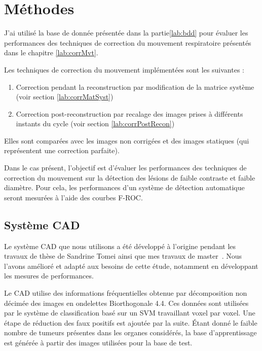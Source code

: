\chapter{Méthodes}

J'ai utilisé la base de donnée présentée dans la partie\ref{lab:bdd} pour évaluer les performances des techniques de correction du mouvement respiratoire présentés dans le chapitre \ref{lab:corrMvt}. 

Les techniques de correction du mouvement implémentées sont les suivantes :

\begin{enumerate}
 \item Correction pendant la reconstruction par modification de la matrice système (voir section \ref{lab:corrMatSyst})
 \item Correction post-reconstruction par recalage des images prises à différents instants du cycle (voir section \ref{lab:corrPostRecon})
\end{enumerate}

Elles sont comparées avec les images non corrigées et des images statiques (qui représentent une correction parfaite).

Dans le cas présent, l'objectif est d'évaluer les performances des techniques de correction du mouvement sur la détection des lésions de faible contraste et faible diamètre. Pour cela, les performances d'un système de détection automatique seront mesurées à l'aide des courbes F-ROC.

\section{Système CAD} %

Le système CAD que nous utilisons a été développé à l'origine pendant les travaux de thèse de Sandrine Tomei ainsi que mes travaux de master~\cite{tomei2008automatic,lartizien2010impact}. Nous l'avons amélioré et adapté aux besoins de cette étude, notamment en développant les mesures de performances.


Le CAD utilise des informations fréquentielles obtenue par décomposition non décimée des images en ondelettes Biorthogonale 4.4. Ces données sont utilisées par le système de classification basé sur un SVM travaillant voxel par voxel. Une étape de réduction des faux positifs est ajoutée par la suite.
\'Etant donné le faible nombre de tumeurs présentes dans les organes considérés, la base d'apprentissage est générée à partir des images utilisées pour la base de test. 


